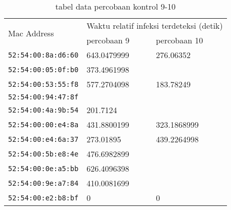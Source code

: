 \begin{table}[H]
	\caption{tabel data percobaan kontrol 9-10}
	\label{table:data percobaan kontrol 9_10}
	\centering
	\footnotesize
	\begin{tabular}{|l|l|l|}
		\hline
		\multirow{2}{*}{Mac Address} & \multicolumn{2}{c|}{Waktu relatif infeksi terdeteksi (detik)} \\ \cline{2-3} 
		& percobaan 9 & percobaan 10 \\ \hline
		\footnotesize{\verb|52:54:00:8a:d6:60|} & 643.0479999 & 276.06352 \\ \hline
		\footnotesize{\verb|52:54:00:05:0f:b0|} & 373.4961998 &  \\ \hline
		\footnotesize{\verb|52:54:00:53:55:f8|} & 577.2704098 & 183.78249 \\ \hline
		\footnotesize{\verb|52:54:00:94:47:8f|} &  &  \\ \hline
		\footnotesize{\verb|52:54:00:4a:9b:54|} & 201.7124 &  \\ \hline
		\footnotesize{\verb|52:54:00:00:e4:8a|} & 431.8800199 & 323.1868999 \\ \hline
		\footnotesize{\verb|52:54:00:e4:6a:37|} & 273.01895 & 439.2264998 \\ \hline
		\footnotesize{\verb|52:54:00:5b:e8:4e|} & 476.6982899 &  \\ \hline
		\footnotesize{\verb|52:54:00:0e:a5:bb|} & 626.4096398 &  \\ \hline
		\footnotesize{\verb|52:54:00:9e:a7:84|} & 410.0081699 &  \\ \hline
		\footnotesize{\verb|52:54:00:e2:b8:bf|} & 0 & 0 \\ \hline
	\end{tabular}
\end{table}

\pagebreak


